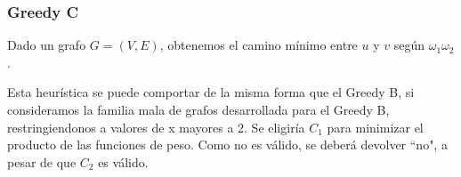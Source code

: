 \clearpage
\subsubsection{Greedy C}\label{subsubsec:greedy-c}
Dado un grafo $G = (V,E)$, obtenemos el camino m\'inimo entre $u$ y $v$ seg\'un $\omega_1\omega_2$. 

Esta heurística se puede comportar de la misma forma que el Greedy B, si consideramos la familia mala de grafos desarrollada para el Greedy B,
restringiendonos a valores de x mayores a 2. Se eligiría $C_1$  para minimizar el producto de las funciones de peso. Como no es válido,
se deberá devolver ``no", a pesar de que $C_2$ es válido. 
